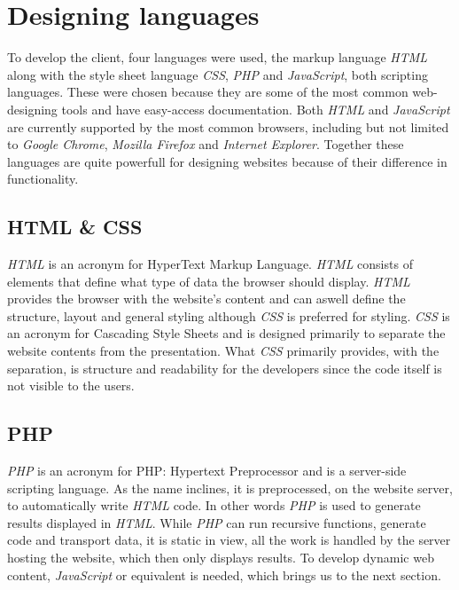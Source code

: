 \section{Designing languages}
To develop the client, four languages were used, the markup language \textit{HTML} along with the style sheet language \textit{CSS}, \textit{PHP} and \textit{JavaScript}, both scripting languages. These were chosen because they are some of the most common web-designing tools and have easy-access documentation. Both \textit{HTML} and \textit{JavaScript} are currently supported by the most common browsers, including but not limited to \textit{Google Chrome}, \textit{Mozilla Firefox} and \textit{Internet Explorer}.
Together these languages are quite powerfull for designing websites because of their difference in functionality.

\subsection{HTML \& CSS}
\textit{HTML} is an acronym for HyperText Markup Language. \textit{HTML} consists of elements that define what type of data the browser should display. \textit{HTML} provides the browser with the website's content and can aswell define the structure, layout and general styling although \textit{CSS} is preferred for styling. \textit{CSS} is an acronym for Cascading Style Sheets and is designed primarily to separate the website contents from the presentation.
What \textit{CSS} primarily provides, with the separation, is structure and readability for the developers since the code itself is not visible to the users.\cite{html}\cite{css}

\subsection{PHP}
\textit{PHP} is an acronym for PHP: Hypertext Preprocessor and is a server-side scripting language. As the name inclines, it is preprocessed, on the website server, to automatically write \textit{HTML} code. In other words \textit{PHP} is used to generate results displayed in \textit{HTML}. While \textit{PHP} can run recursive functions, generate code and transport data, it is static in view, all the work is handled by the server hosting the website, which then only displays results. To develop dynamic web content, \textit{JavaScript} or equivalent is needed, which brings us to the next section.\cite{php}

